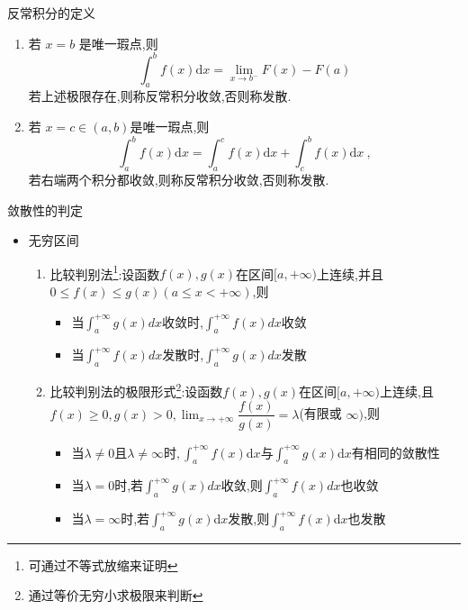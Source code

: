 \documentclass[8pt a4paper, oneside, UTF8]{ctexbook}  %
\begin{document}
\begin{sloppypar}
\begin{defn}{反常积分的定义}{}
\begin{itemize}
\begin{enumerate}
                      \item 若 $x=b$ 是唯一瑕点,则
                            $$\int_a^bf(x)\mathrm{d}x=\lim_{x\to b^-}F(x)-F(a)$$
                            若上述极限存在,则称反常积分收敛,否则称发散.
                      \item 若 $x=c\in(a,b)$是唯一瑕点,则
                            $$\int_a^bf(x)\mathrm{d}x=\int_a^cf(x)\mathrm{d}x+\int_c^bf(x)\mathrm{d}x\:,$$
                            若右端两个积分都收敛,则称反常积分收敛,否则称发散.
                  \end{enumerate}
        \end{itemize}
    \end{defn}
    \begin{criterion}{敛散性的判定}{}
        \begin{itemize}
            \item 无穷区间
                  \begin{enumerate}
                      \item 比较判别法\footnote{可通过不等式放缩来证明}:设函数$f(x),g(x)$在区间$[a, +\infty )$上连续,并且$0\leqslant f(x)\leqslant g(x)(a\leqslant x<+\infty)$,则
                            \begin{itemize}
                                \item 当$\int_a^{+\infty}g(x) dx$收敛时,$\int_a^{+\infty} f(x) dx$收敛
                                \item 当$\int_a^{+\infty}f(x) dx$发散时,$\int_a^{+\infty} g(x) dx$发散
                            \end{itemize}
                      \item 比较判别法的极限形式\footnote{通过等价无穷小求极限来判断}:设函数$f(x),g(x)$在区间$[a,+\infty)$上连续,且$f(x)\geqslant0,g(x)>0,\lim_{x\to+\infty}\dfrac{f(x)}{g(x)}=\lambda$(有限或 $\infty)$,则
                            \begin{itemize}
                                \item 当$\lambda\neq0$且$\lambda\neq\infty$时$,\int_a^{+\infty} f(x)$d$x$与$\int_a^{+\infty} g(x)$d$x$有相同的敛散性
                                \item 当$\lambda=0$时,若$\int_{a}^{+\infty}g(x) dx$收敛,则$\int_a^{+\infty}f(x) dx$也收敛
                                \item 当$\lambda=\infty$时,若$\int_a^{+\infty} g(x)$d$x$发散,则$\int_a^{+\infty}f(x)$d$x$也发散
                            \end{itemize}

\end{enumerate}
\end{itemize}
\end{criterion}
\end{sloppypar}
\end{document}
